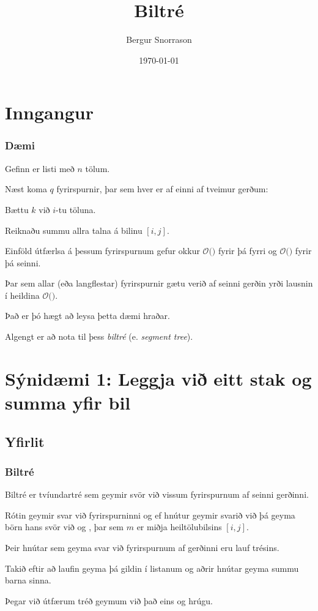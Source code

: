 \title{Biltré}
\author{Bergur Snorrason}
\date{\today}



\frame{\titlepage}

\section{Inngangur}
{
	\frametitle{Dæmi}
	{
		\item<1-> Gefinn er listi með $n$ tölum.
		\item<2-> Næst koma $q$ fyrirspurnir, þar sem hver er af einni af tveimur gerðum:
		{
			\item<3-> Bættu $k$ við $i$-tu töluna.
			\item<4-> Reiknaðu summu allra talna á bilinu $[i, j]$.
		}
		\item<5-> Einföld útfærlsa á þessum fyrirspurnum gefur okkur
					$\mathcal{O}($$)$ fyrir þá fyrri og
					$\mathcal{O}($$)$ fyrir þá seinni.
		\item<8-> Þar sem allar (eða langflestar) fyrirspurnir gætu verið af seinni gerðin yrði lausnin í heildina
					$\mathcal{O}($\onslide<9->{$qn$}$)$.
		\item<10-> Það er þó hægt að leysa þetta dæmi hraðar.
		\item<11-> Algengt er að nota til þess \emph{biltré} (e. \emph{segment tree}).
	}
}

\section{Sýnidæmi 1: Leggja við eitt stak og summa yfir bil}
\subsection{Yfirlit}
{
	\frametitle{Biltré}
	{
		\item<1-> Biltré er tvíundartré sem geymir svör við vissum fyrirspurnum af seinni gerðinni.
		\item<2-> Rótin geymir svar við fyrirspurninni  
					og ef hnútur geymir svarið við  þá geyma börn hans svör við 
					og , þar sem $m$ er miðja heiltölubilsins $[i, j]$.
		\item<3-> Þeir hnútar sem geyma svar við fyrirspurnum af gerðinni  eru lauf trésins.
		\item<4-> Takið eftir að laufin geyma þá gildin í listanum og aðrir hnútar geyma summu barna sinna.
		\item<5-> Þegar við útfærum tréð geymum við það eins og hrúgu.
	}
}

